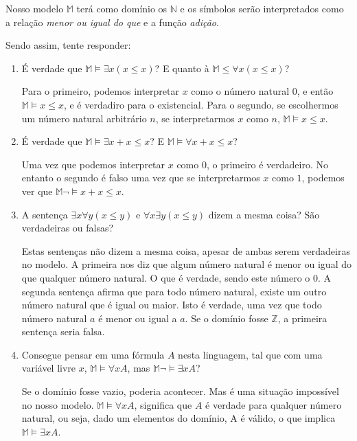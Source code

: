    Nosso modelo $\mathbb{M}$ terá como domínio os $\mathbb{N}$ e os símbolos  serão interpretados como a relação \textit{menor ou igual do que} e a função \textit{adição}.
   
  Sendo assim, tente responder:
  
  \begin{enumerate}
      
      \item É verdade que $\mathbb{M} \vDash \exists x (x \leq x)$? E quanto à $\mathbb{M} \leq \forall x (x \leq x)$?
      
      Para o primeiro, podemos interpretar $x$ como o número natural $0$, e então $\mathbb{M} \vDash x \leq x$, e é verdadiro para o existencial.
      Para o segundo, se escolhermos um número natural arbitrário $n$, se interpretarmos $x$ como $n$, $\mathbb{M} \vDash x \leq x.$
      
      \item É verdade que $\mathbb{M} \vDash \exists x+x \leq x$? E $\mathbb{M} \vDash \forall x+x \leq x$?
      
      Uma vez que podemos interpretar $x$ como $0$, o primeiro é verdadeiro. No entanto o segundo é falso uma vez que se interpretarmos $x$ como $1$, podemos ver que $\mathbb{M} \neg \vDash x+x \leq x$.
      
      \item A sentença $\exists x \forall y (x \leq y)$ e $\forall x \exists y (x \leq y)$ dizem a mesma coisa? São verdadeiras ou falsas?
      
      Estas sentenças não dizem a mesma coisa, apesar de ambas serem verdadeiras no modelo. A primeira nos diz que algum número natural é menor ou igual do que qualquer número natural. O que é verdade, sendo este número o $0$.
      A segunda sentença afirma que para todo número natural, existe um outro número natural que é igual ou maior. Isto é verdade, uma vez que todo número natural $a$ é menor ou igual a $a$. Se o domínio fosse $\mathbb{Z}$, a primeira sentença seria falsa.
      
      \item Consegue pensar em uma fórmula $A$ nesta linguagem, tal que com uma variável livre $x$, $\mathbb{M} \vDash \forall x A$, mas $\mathbb{M} \neg \vDash \exists x A $?
      
      Se o domínio fosse vazio, poderia acontecer. Mas é uma situação impossível no nosso modelo. $\mathbb{M} \vDash \forall x A$, significa que $A$ é verdade para qualquer número natural, ou seja, dado um elementos do domínio, A é válido, o que implica $\mathbb{M} \vDash \exists x A$.
 
 
  \end{enumerate}
  

